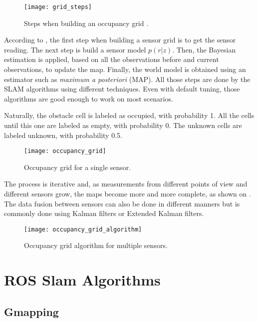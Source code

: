 \begin{figure}[!ht]
    \centering
    \texttt{[image: grid\_steps]}
    \caption{Steps when building an occupancy grid \cite{elfes1989using}.}
    \label{fig:grid_steps}
\end{figure}

According to , the first step when building a sensor grid is to get the sensor reading. The next step is build a sensor model $p(r|z)$. Then, the Bayesian estimation is applied, based on all the observations before and current observations, to update the map. Finally, the world model is obtained using an estimator such as \textit{maximum a posteriori} (MAP). All those steps are done by the SLAM algorithms using different techniques. Even with default tuning, those algorithms are good enough to work on most scenarios.

Naturally, the obstacle cell is labeled as occupied, with probability 1. All the cells until this one are labeled as empty, with probability 0. The unknown cells are labeled unknown, with probability 0.5.

\begin{figure}[!ht]
    \centering
    \texttt{[image: occupancy\_grid]}
    \caption{Occupancy grid for a single sensor.}
    \label{fig:occupancy_grid}
\end{figure}

The process is iterative and, as measurements from different points of view and different sensors grow, the maps become more and more complete, as shown on . The data fusion between sensors can also be done in different manners but is commonly done using Kalman filters or Extended Kalman filters.

\begin{figure}[!ht]
    \centering
    \texttt{[image: occupancy\_grid\_algorithm]}
    \caption{Occupancy grid algorithm for multiple sensors.}
    \label{fig:occupancy_grid_algorithm}
\end{figure}

\section{ROS Slam Algorithms}

\subsection{Gmapping}

